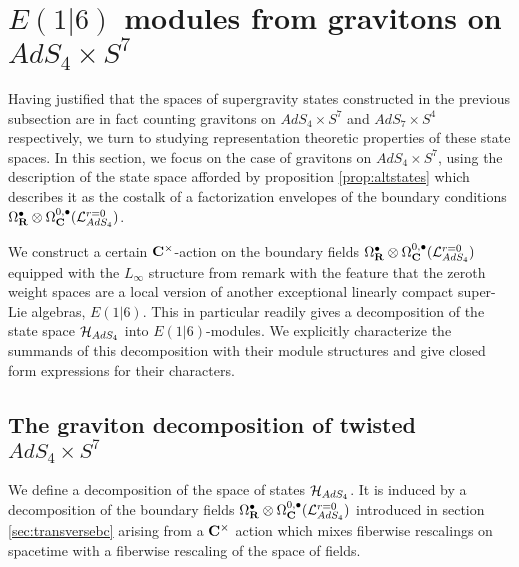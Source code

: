 \documentclass[../main.tex]{subfiles}
\begin{document}
 

\section{$E(1|6)$ modules from gravitons on $AdS_4\times S^7$}\label{sec:e16}

Having justified that the spaces of supergravity states constructed in the previous subsection are in fact counting gravitons on $AdS_4\times S^7$ and $AdS_7\times S^4$ respectively, we turn to studying representation theoretic properties of these state spaces. In this section, we focus on the case of gravitons on $AdS_4\times S^7$, using the description of the state space afforded by proposition \ref{prop:altstates} which describes it as the costalk of a factorization envelopes of the boundary conditions $\Omega^\bullet _{\mathbf{R}}\otimes \Omega^{0,\bullet}_{\mathbf{C}} (\mathcal{L}^{{r=0}}_{AdS_4} )$.

We construct a certain $\mathbf{C}^\times$-action on the boundary fields $\Omega^\bullet _{\mathbf{R}}\otimes \Omega^{0,\bullet}_{\mathbf{C}} (\mathcal{L}^{{r=0}}_{AdS_4} )$ equipped with the $L_\infty$ structure from remark \label{rmk:nottransferred} with the feature that the zeroth weight spaces are a local version of another exceptional linearly compact super-Lie algebras, $E(1|6)$. This in particular readily gives a decomposition of the state space $\mathcal{H}_{AdS_4}$ into $E(1|6)$-modules. We explicitly characterize the summands of this decomposition with their module structures and give closed form expressions for their characters.

\subsection{The graviton decomposition of twisted $AdS_4\times S^7$}
\parsec{}
We define a decomposition of the space of states $\mathcal{H}_{AdS_4}$. 
It is induced by a decomposition of the boundary fields $\Omega^\bullet_{\mathbf{R}}\otimes \Omega^{0,\bullet}_{\mathbf{C}} (\mathcal{L}^{{r=0}}_{AdS_4} )$ introduced in section \ref{sec:transversebc}  arising from a $\mathbf{C}^\times$ action which mixes fiberwise rescalings on spacetime with a fiberwise rescaling of the space of fields. 
\end{document}

